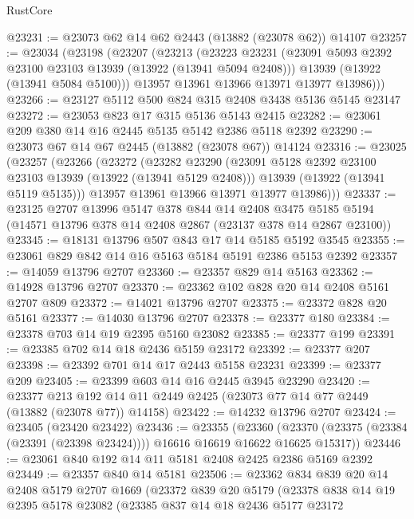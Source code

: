 \begin{lexlean}{RustCore}
\begin{coremodule}
@23231 := @23073 @62 @14 @62 @2443 (@13882 (@23078 @62)) @14107
@23257 := @23034
    (@23198
      (@23207
        (@23213
          (@23223
            @23231
            (@23091 @5093 @2392 @23100 @23103 @13939 (@13922 (@13941 @5094 @2408)))
            @13939
            (@13922 (@13941 @5084 @5100)))
          @13957
          @13961
          @13966
          @13971
          @13977
          @13986)))
@23266 := @23127 @5112 @500 @824 @315 @2408 @3438 @5136 @5145 @23147
@23272 := @23053 @823 @17 @315 @5136 @5143 @2415
@23282 := @23061 @209 @380 @14 @16 @2445 @5135 @5142 @2386 @5118 @2392
@23290 := @23073 @67 @14 @67 @2445 (@13882 (@23078 @67)) @14124
@23316 := @23025
    (@23257
      (@23266
        (@23272
          (@23282
            @23290
            (@23091 @5128 @2392 @23100 @23103 @13939 (@13922 (@13941 @5129 @2408)))
            @13939
            (@13922 (@13941 @5119 @5135)))
          @13957
          @13961
          @13966
          @13971
          @13977
          @13986)))
@23337 := @23125
    @2707
    @13996
    @5147
    @378
    @844
    @14
    @2408
    @3475
    @5185
    @5194
    (@14571 @13796 @378 @14 @2408 @2867 (@23137 @378 @14 @2867 @23100))
@23345 := @18131 @13796 @507 @843 @17 @14 @5185 @5192 @3545
@23355 := @23061 @829 @842 @14 @16 @5163 @5184 @5191 @2386 @5153 @2392
@23357 := @14059 @13796 @2707
@23360 := @23357 @829 @14 @5163
@23362 := @14928 @13796 @2707
@23370 := @23362 @102 @828 @20 @14 @2408 @5161 @2707 @809
@23372 := @14021 @13796 @2707
@23375 := @23372 @828 @20 @5161
@23377 := @14030 @13796 @2707
@23378 := @23377 @180
@23384 := @23378 @703 @14 @19 @2395 @5160 @23082
@23385 := @23377 @199
@23391 := @23385 @702 @14 @18 @2436 @5159 @23172
@23392 := @23377 @207
@23398 := @23392 @701 @14 @17 @2443 @5158 @23231
@23399 := @23377 @209
@23405 := @23399 @603 @14 @16 @2445 @3945 @23290
@23420 := @23377
    @213
    @192
    @14
    @11
    @2449
    @2425
    (@23073 @77 @14 @77 @2449 (@13882 (@23078 @77)) @14158)
@23422 := @14232 @13796 @2707
@23424 := @23405 (@23420 @23422)
@23436 := @23355
    (@23360 (@23370 (@23375 (@23384 (@23391 (@23398 @23424)))) @16616 @16619 @16622 @16625 @15317))
@23446 := @23061 @840 @192 @14 @11 @5181 @2408 @2425 @2386 @5169 @2392
@23449 := @23357 @840 @14 @5181
@23506 := @23362
    @834
    @839
    @20
    @14
    @2408
    @5179
    @2707
    @1669
    (@23372
      @839
      @20
      @5179
      (@23378
        @838
        @14
        @19
        @2395
        @5178
        @23082
        (@23385
          @837
          @14
          @18
          @2436
          @5177
          @23172

\end{coremodule}
\end{lexlean}
